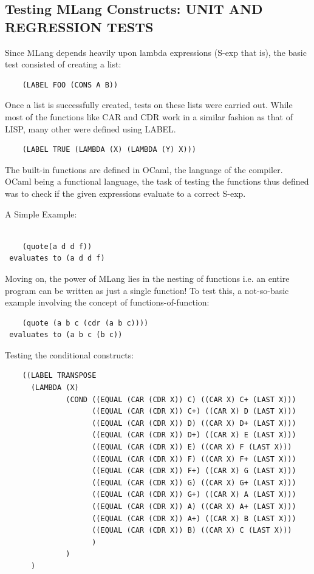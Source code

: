\documentclass[letterpaper,11pt]{article}
\begin{document}
{\subsection{Testing MLang Constructs: UNIT AND REGRESSION TESTS}

Since MLang depends heavily upon lambda expressions (S-exp that is), the basic test consisted of creating a list:


\lstset{language=Lisp}
\begin{lstlisting}
	(LABEL FOO (CONS A B))

\end{lstlisting}
Once a list is successfully created, tests on these lists were carried out. While most of the functions like CAR and CDR work in a similar fashion as that of LISP, many other were defined using LABEL.

\lstset{language=Lisp}
\begin{lstlisting}
	(LABEL TRUE (LAMBDA (X) (LAMBDA (Y) X)))

\end{lstlisting}
The built-in functions are defined in OCaml, the language of the compiler. OCaml being a functional language, the task of testing the functions thus defined was to check if the given expressions evaluate to a correct S-exp.

A Simple Example:
\lstset{language=Lisp}
\begin{lstlisting}

	(quote(a d d f))
 evaluates to (a d d f)

\end{lstlisting}

Moving on, the power of MLang lies in the nesting of functions i.e. an entire program can be written as just a single function!
To test this, a not-so-basic example involving the concept of functions-of-function:

\lstset{language=Lisp}
\begin{lstlisting}
	(quote (a b c (cdr (a b c))))
 evaluates to (a b c (b c))

\end{lstlisting}

Testing the conditional constructs:

\lstset{language=Lisp}
\begin{lstlisting}
	((LABEL TRANSPOSE
      (LAMBDA (X)
              (COND ((EQUAL (CAR (CDR X)) C) ((CAR X) C+ (LAST X)))
                    ((EQUAL (CAR (CDR X)) C+) ((CAR X) D (LAST X)))
                    ((EQUAL (CAR (CDR X)) D) ((CAR X) D+ (LAST X)))
                    ((EQUAL (CAR (CDR X)) D+) ((CAR X) E (LAST X)))
                    ((EQUAL (CAR (CDR X)) E) ((CAR X) F (LAST X)))
                    ((EQUAL (CAR (CDR X)) F) ((CAR X) F+ (LAST X)))
                    ((EQUAL (CAR (CDR X)) F+) ((CAR X) G (LAST X)))
                    ((EQUAL (CAR (CDR X)) G) ((CAR X) G+ (LAST X)))
                    ((EQUAL (CAR (CDR X)) G+) ((CAR X) A (LAST X)))
                    ((EQUAL (CAR (CDR X)) A) ((CAR X) A+ (LAST X)))
                    ((EQUAL (CAR (CDR X)) A+) ((CAR X) B (LAST X)))
                    ((EQUAL (CAR (CDR X)) B) ((CAR X) C (LAST X)))
                    )
              )
      )


\end{lstlisting}}
\end{document}
